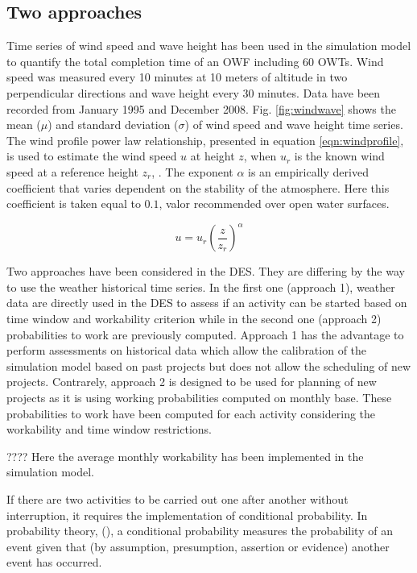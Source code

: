 \subsection{Two approaches}
Time series of wind speed and wave height has been used in the simulation model to quantify the total completion time of an OWF including 60 OWTs. Wind speed was measured every 10 minutes at 10 meters of altitude in two perpendicular directions and wave height every 30 minutes. Data have been recorded from January 1995 and December 2008.
Fig. \ref{fig:windwave} shows the mean ($\mu$) and standard deviation ($\sigma$) of wind speed and wave height time series.
The wind profile power law relationship, presented in equation \ref{eqn:windprofile}, is used to estimate the wind speed $u$ at height $z$, when $u_{r}$ is the known wind speed at a reference height $z_{r}$, \cite{1978Peterson}. The exponent $\alpha$ is an empirically derived coefficient that varies dependent on the stability of the atmosphere. Here this coefficient is taken equal to $0.1$, valor recommended over open water surfaces.

\begin{equation}
\label{eqn:windprofile}
u = u_{r} \left( \frac{z}{z_r} \right)^{\alpha}
\end{equation}

Two approaches have been considered in the DES. They are differing by the way to use the weather historical time series. In the first one (approach 1), weather data are directly used in the DES to assess if an activity can be started based on time window and workability criterion while in the second one (approach 2) probabilities to work are previously computed. Approach 1 has the advantage to perform assessments on historical data which allow the calibration of the simulation model based on past projects but does not allow the scheduling of new projects. Contrarely, approach 2 is designed to be used for planning of new projects as it is using working probabilities computed on monthly base. These probabilities to work have been computed for each activity considering the workability and time window restrictions.

???? Here the average monthly workability has been implemented in the simulation model. 

If there are two activities to be carried out one after another without interruption, it requires the implementation of conditional probability.  
In probability theory, (\cite{Thalemann2012}), a conditional probability measures the probability of an event given that (by assumption, presumption, assertion or evidence) another event has occurred. 

